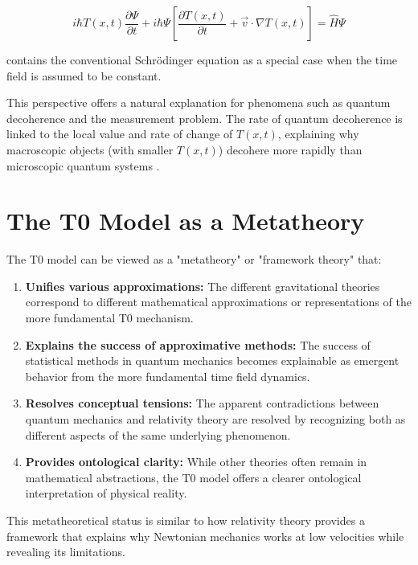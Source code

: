 \documentclass[12pt,a4paper]{article}
\newcommand{\Tfieldt}{T(x,t)}
\begin{document}
	\begin{equation}
		i\hbar \Tfieldt \frac{\partial\Psi}{\partial t} + i\hbar \Psi \left[\frac{\partial \Tfieldt}{\partial t} + \vec{v}\cdot\nabla\Tfieldt\right] = \hat{H} \Psi
		\label{eq:dynamic_schrodinger}
	\end{equation}
	
	contains the conventional Schrödinger equation as a special case when the time field is assumed to be constant.
	
	This perspective offers a natural explanation for phenomena such as quantum decoherence and the measurement problem. The rate of quantum decoherence is linked to the local value and rate of change of $\Tfieldt$, explaining why macroscopic objects (with smaller $\Tfieldt$) decohere more rapidly than microscopic quantum systems \cite{pascher_quantum_2025}.
	
	\section{The T0 Model as a Metatheory}
	\label{sec:metatheory}
	
	The T0 model can be viewed as a "metatheory" or "framework theory" that:
	
	\begin{enumerate}
		\item \textbf{Unifies various approximations:} The different gravitational theories correspond to different mathematical approximations or representations of the more fundamental T0 mechanism.
		
		\item \textbf{Explains the success of approximative methods:} The success of statistical methods in quantum mechanics becomes explainable as emergent behavior from the more fundamental time field dynamics.
		
		\item \textbf{Resolves conceptual tensions:} The apparent contradictions between quantum mechanics and relativity theory are resolved by recognizing both as different aspects of the same underlying phenomenon.
		
		\item \textbf{Provides ontological clarity:} While other theories often remain in mathematical abstractions, the T0 model offers a clearer ontological interpretation of physical reality.
	\end{enumerate}
	
	This metatheoretical status is similar to how relativity theory provides a framework that explains why Newtonian mechanics works at low velocities while revealing its limitations.
	
\end{document}
